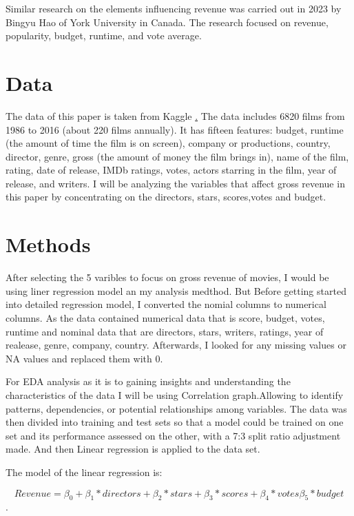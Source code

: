 \documentclass[12pt]{article}
\begin{document}
Similar research on the elements influencing revenue  was carried out in 2023 by Bingyu Hao 
of York University in Canada. The research focused on revenue, popularity, budget, runtime, and vote average.

\section{Data}
\label{sec:data}

The data of this paper is taken from Kaggle \href{https://www.kaggle.com/datasets/danielgrijalvas/movies}. 
The data includes 6820 films from 1986 to 2016 (about 220 films annually). It has
fifteen features: budget, runtime (the amount of time the film is on screen), company 
or productions, country, director, genre, gross (the amount of money the film brings in), 
name of the film, rating, date of release, IMDb ratings, votes, actors starring in the
film, year of release, and writers. I will be analyzing the variables that affect
gross revenue in this paper by concentrating on the directors, stars, scores,votes and budget.

\section{Methods}
\label{sec:meth}

After selecting the 5 varibles to focus on gross revenue of movies, I would be using
liner regression model an my analysis medthod. But Before getting started into detailed 
regression model, I converted the nomial columns to numerical columns. As the data contained 
numerical data that is score, budget, votes, runtime and nominal data that are directors, 
stars, writers, ratings, year of realease, genre, company, country. Afterwards, I looked 
for any missing values or NA values and replaced them with 0.

For EDA analysis as it is to gaining insights and understanding the characteristics 
of the data I will be using Correlation graph.Allowing to identify patterns, dependencies,
or potential relationships among variables. The data was then divided into training and 
test sets so that a model could be trained on one set and its performance assessed on the 
other, with a 7:3 split ratio adjustment made. And then Linear regression is applied to 
the data set.

The model of the linear regression is:

$$Revenue = \beta_0 +\beta_1*directors + \beta_2*stars + \beta_3*scores + \beta_4*votes \beta_5*budget$$.
\end{document}
